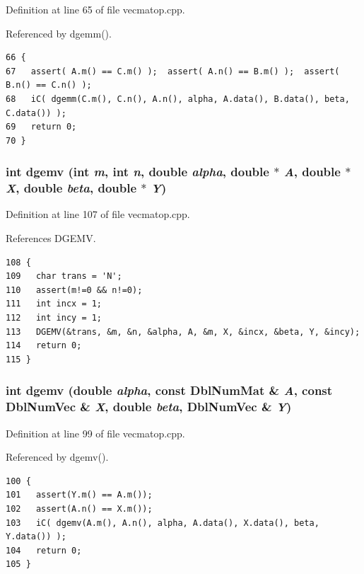 Definition at line 65 of file vecmatop.cpp.

Referenced by dgemm().

\footnotesize\begin{verbatim}66 {
67   assert( A.m() == C.m() );  assert( A.n() == B.m() );  assert( B.n() == C.n() );
68   iC( dgemm(C.m(), C.n(), A.n(), alpha, A.data(), B.data(), beta, C.data()) );
69   return 0;
70 }
\end{verbatim}\normalsize 


\subsubsection{\setlength{\rightskip}{0pt plus 5cm}int dgemv (int {\em m}, int {\em n}, double {\em alpha}, double $\ast$ {\em A}, double $\ast$ {\em X}, double {\em beta}, double $\ast$ {\em Y})}\label{vecmatop_8cpp_f86104cd2d030678903b8a17738ff742_f86104cd2d030678903b8a17738ff742}




Definition at line 107 of file vecmatop.cpp.

References DGEMV.

\footnotesize\begin{verbatim}108 {
109   char trans = 'N';
110   assert(m!=0 && n!=0);
111   int incx = 1;
112   int incy = 1;
113   DGEMV(&trans, &m, &n, &alpha, A, &m, X, &incx, &beta, Y, &incy);
114   return 0;
115 }
\end{verbatim}\normalsize 


\subsubsection{\setlength{\rightskip}{0pt plus 5cm}int dgemv (double {\em alpha}, const {\bf Dbl\-Num\-Mat} \& {\em A}, const {\bf Dbl\-Num\-Vec} \& {\em X}, double {\em beta}, {\bf Dbl\-Num\-Vec} \& {\em Y})}\label{vecmatop_8cpp_1f65eba330c9ba99a02f9ec4ecdc51ef_1f65eba330c9ba99a02f9ec4ecdc51ef}




Definition at line 99 of file vecmatop.cpp.

Referenced by dgemv().

\footnotesize\begin{verbatim}100 {
101   assert(Y.m() == A.m());
102   assert(A.n() == X.m());
103   iC( dgemv(A.m(), A.n(), alpha, A.data(), X.data(), beta, Y.data()) );
104   return 0;
105 }
\end{verbatim}\normalsize 


